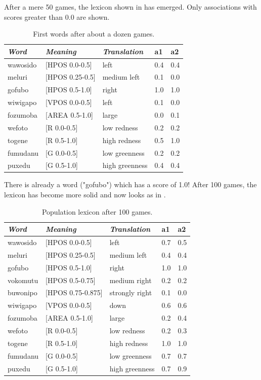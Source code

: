 After a mere 50 games, the lexicon shown in  has emerged. Only
associations with scores greater than 0.0 are shown. 
\begin{table}
\begin{center}
\begin{tabular}{| l | l | l | l | l |} \hline
{\it Word}&{\it Meaning}&{\it Translation} & {\bf a1}&{\bf a2} \\ \hline
wawosido & [HPOS 0.0-0.5] &left&0.4&0.4\\ \hline
meluri & [HPOS 0.25-0.5] &medium left&0.1&0.0\\ \hline
gofubo & [HPOS 0.5-1.0]& right&1.0&1.0\\ \hline
wiwigapo & [VPOS 0.0-0.5] &left&0.1&0.0\\ \hline
fozumoba & [AREA 0.5-1.0]&large & 0.0&0.1\\ \hline
wefoto & [R 0.0-0.5]& low redness &0.2&0.2\\ \hline
togene & [R 0.5-1.0]& high redness &0.5&1.0\\ \hline
fumudanu & [G 0.0-0.5]& low greenness &0.2&0.2\\ \hline
puxedu & [G 0.5-1.0]& high greenness &0.4&0.4\\ \hline
\end{tabular}
\caption{\label{tab:game50} First words after about a dozen games.}
\end{center}
\end{table}
There is already a word ("gofubo") which has
a score of 1.0! After 100 games, the lexicon has become more 
solid and now looks as in . 
\begin{table}
\begin{center}
\begin{tabular}{| l | l | l | l | l |} \hline
{\it Word}&{\it Meaning}&{\it Translation} & {\bf a1}&{\bf a2} \\ \hline
wawosido & [HPOS 0.0-0.5] &left&0.7&0.5\\ \hline
meluri & [HPOS 0.25-0.5] &medium left&0.4&0.4\\ \hline
gofubo & [HPOS 0.5-1.0]& right&1.0&1.0\\ \hline
vokomutu & [HPOS 0.5-0.75] &medium right&0.2&0.2\\ \hline
buwonipo & [HPOS 0.75-0.875] &strongly right&0.1&0.0\\ \hline
wiwigapo & [VPOS 0.0-0.5] &down&0.6&0.6\\ \hline
fozumoba & [AREA 0.5-1.0]&large & 0.2&0.4\\ \hline
wefoto & [R 0.0-0.5]& low redness &0.2&0.3\\ \hline
togene & [R 0.5-1.0]& high redness &1.0&1.0\\ \hline
fumudanu & [G 0.0-0.5]& low greenness &0.7&0.7\\ \hline
puxedu & [G 0.5-1.0]& high greenness &0.7&0.9\\ \hline
\end{tabular}
\caption{\label{tab:goubo} Population lexicon after 100 games.}
\end{center}
\end{table}

